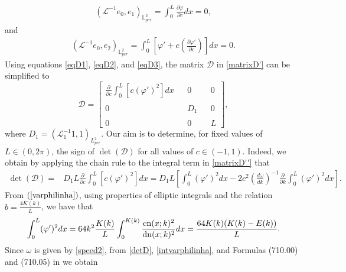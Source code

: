 \documentclass[12pt,reqno,a4paper]{amsart} %
\numberwithin{equation}{section}
\numberwithin{figure}{section}
\begin{document}
 \begin{align}\label{eqD2}
 	(\mathcal{L}^{-1}e_0,e_1)_{\mathbb{L}^2_{per}}=%
 	\int_{0}^{L}\frac{\partial\varphi}{\partial c} dx=0,
 \end{align}
 and 
 \begin{align}\label{eqD3}
 	(\mathcal{L}^{-1}e_0,e_2)_{\mathbb{L}^2_{per}}=%
 	\int_{0}^{L}\left[\varphi'+c\left(\frac{\partial\varphi'}{\partial c}\right)\right] dx=0.
 \end{align}
 \indent Using equations \eqref{eqD1}, \eqref{eqD2}, and \eqref{eqD3}, the matrix $\mathcal{D}$ in \eqref{matrixD'} can be simplified to
 \begin{equation}\label{matrixD''}
 	\mathcal{D}=\left[\begin{array}{llllll} \displaystyle \frac{\partial}{\partial c}\int_0^L[c(\varphi')^2]dx
 		& &  0& & 	 	0\\\\0& &D_1& & 0\\\\
 		0& & 0& & L\end{array}\right],
 \end{equation}
 where $D_1=(\mathcal{L}_{1}^{-1}1,1)_{L_{per}^2}$. Our aim is to determine, for fixed values of $L \in (0, 2\pi)$, the sign of $\det(\mathcal{D})$ for all values of $c\in (-1,1)$. Indeed, we obtain by applying the chain rule to the integral term in \eqref{matrixD''} that
 \begin{align}\label{detD}
 	\det(\mathcal{D})=&D_1 L \frac{\partial}{\partial c}\int_{0}^{L}[c(\varphi')^2]dx=D_1L\left[\int_{0}^{L}(\varphi')^2dx-2c^2\left(\frac{d\omega}{dk}\right)^{-1}\frac{\partial}{\partial k}\int_{0}^{L}(\varphi')^2dx\right].
 \end{align}
 From $(\ref{varphilinha})$, using properties of elliptic integrals and the relation $b=\frac{4K(k)}{L}$, we have that
 \begin{equation}\label{intvarphilinha}
 \int_{0}^{L}(\varphi')^2dx=64k^2\frac{K(k)}{L}\int_0^{K(k)}\frac{{\rm cn}(x;k)^2}{{\rm dn}(x;k)^2}dx=\frac{64K(k)(K(k)-E(k))}{L}.
 \end{equation}
 Since $\omega$ is given by \eqref{speed2}, from \eqref{detD}, \eqref{intvarphilinha}, and Formulas (710.00) and (710.05) in \cite{byrd} we obtain 
 
\end{document}
